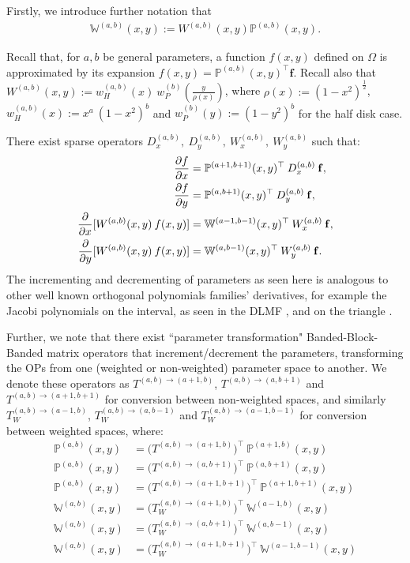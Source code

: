 \documentclass[11pt, oneside]{article}   	%
\newcommand{\half}{\frac{1}{2}}
\newcommand{\bigP}{\mathbb{P}}
\newcommand{\Wab}{{W^{(a,b)}}}
\newcommand{\bigPab}{\bigP^{(a,b)}}
\newcommand{\bigW}{\mathbb{W}}
\newcommand{\bigWab}{\mathbb{W}^{(a,b)}}
\begin{document}
Firstly, we introduce further notation that
\begin{align}
\bigWab(x,y) := \Wab(x,y) \bigPab(x,y).
\end{align}

Recall that, for $a, b$ be general parameters, a function $f(x,y)$ defined on $\Omega$ is approximated by its expansion $f(x,y) = \bigPab(x,y)^\top \mathbf{f}$. Recall also that $\Wab(x,y) := w_H^{(a,b)}(x) \: w_P^{(b)}(\frac{y}{\rho(x)})$, where $\rho(x) := (1-x^2)^\half$, $w_H^{(a,b)}(x) := x^a \: (1-x^2)^b$ and $w_P^{(b)}(y) := (1-y^2)^b$ for the half disk case.

There exist sparse operators \(D_x^{(a,b)}, \: D_y^{(a,b)}, \: W_x^{(a,b)}, \: W_y^{(a,b)}\) such that:
\begin{align}
{\partial f \over \partial x}&= \bigP^{(a+1,b+1)}(x,y)^\top \: D_x^{(a,b)} \: \mathbf{f}, \\
{\partial f \over \partial y} &= \bigP^{(a,b+1)}(x,y)^\top \: D_y^{(a,b)} \: \mathbf{f}, \\
{\partial \over \partial x}[\Wab(x,y) \: f(x,y)] &= \bigW^{(a-1,b-1)}(x,y)^\top \: W_x^{(a,b)} \: \mathbf{f}, \\
{\partial \over \partial y}[\Wab(x,y) \: f(x,y)] &= \bigW^{(a,b-1)}(x,y)^\top \: W_y^{(a,b)} \: \mathbf{f}.
\end{align}
The incrementing and decrementing of parameters as seen here is analogous to other well known orthogonal polynomials families' derivatives, for example the Jacobi polynomials on the interval, as seen in the DLMF \cite{DLMFDerivatives}, and on the triangle \cite{olver2018recurrence}.

Further, we note that there exist ``parameter transformation" Banded-Block-Banded matrix operators that increment/decrement the parameters, transforming the OPs from one (weighted or non-weighted) parameter space to another. We denote these operators as $T^{(a,b)\to(a+1,b)}$, $T^{(a,b)\to(a,b+1)}$ and $T^{(a,b)\to(a+1,b+1)}$ for conversion between non-weighted spaces, and similarly $T_W^{(a,b)\to(a-1,b)}$, $T_W^{(a,b)\to(a,b-1)}$ and $T_W^{(a,b)\to(a-1,b-1)}$ for conversion between weighted spaces, where:
\begin{align}
\bigP^{(a,b)}(x,y) &= \Big(T^{(a,b)\to(a+1,b)} \Big)^\top \: \bigP^{(a+1,b)}(x,y) \\
\bigP^{(a,b)}(x,y) &= \Big(T^{(a,b)\to(a,b+1)} \Big)^\top \: \bigP^{(a,b+1)}(x,y) \\
\bigP^{(a,b)}(x,y) &= \Big(T^{(a,b)\to(a+1,b+1)} \Big)^\top \: \bigP^{(a+1,b+1)}(x,y) \\
\bigW^{(a,b)}(x,y) &= \Big(T_W^{(a,b)\to(a+1,b)} \Big)^\top \: \bigW^{(a-1,b)}(x,y) \\
\bigW^{(a,b)}(x,y) &= \Big(T_W^{(a,b)\to(a,b+1)} \Big)^\top \: \bigW^{(a,b-1)}(x,y) \\
\bigW^{(a,b)}(x,y) &= \Big(T_W^{(a,b)\to(a+1,b+1)} \Big)^\top \: \bigW^{(a-1,b-1)}(x,y) \\
\end{align}
\end{document}
